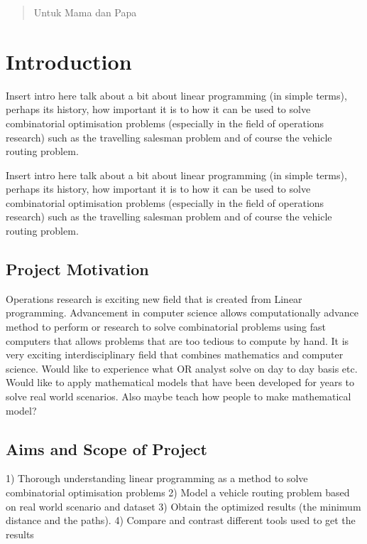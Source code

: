 \documentclass[a4paper, 12pt]{report}
\begin{document}
\renewcommand{\abstractname}{Acknowledgements}
\begin{abstract}
\centering
 Untuk Mama dan Papa
\end{abstract}

\tableofcontents

\chapter{Introduction}
Insert intro here talk about a bit about linear programming (in simple terms), perhaps its history, how important it is to how it can be used to solve combinatorial optimisation problems (especially in the field of operations research) such as the travelling salesman problem and of course the vehicle routing problem.

Insert intro here talk about a bit about linear programming (in simple terms), perhaps its history, how important it is to how it can be used to solve combinatorial optimisation problems (especially in the field of operations research) such as the travelling salesman problem and of course the vehicle routing problem.

\section{Project Motivation}
Operations research is exciting new field that is created from Linear programming. Advancement in computer science allows computationally advance method to perform or research to solve combinatorial problems using fast computers that allows problems that are too tedious to compute by hand. It is very exciting interdisciplinary field that combines mathematics and computer science.  Would like to experience what OR analyst solve on day to day basis etc. Would like to apply mathematical models that have been developed for years to solve real world scenarios. Also maybe teach how people to make mathematical model?

\section{Aims and Scope of Project}
1) Thorough understanding linear programming as a method to solve combinatorial optimisation problems
2) Model a vehicle routing problem based on real world scenario and dataset
3) Obtain the optimized results (the minimum distance and the paths).
4) Compare and contrast different tools used to get the results
\end{document}
